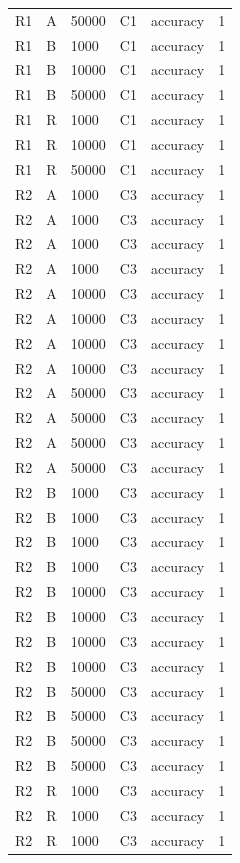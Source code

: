 \begin{longtable}{llllrr}
R1 & A & 50000 & C1 & accuracy & 1 \\
R1 & B & 1000 & C1 & accuracy & 1 \\
R1 & B & 10000 & C1 & accuracy & 1 \\
R1 & B & 50000 & C1 & accuracy & 1 \\
R1 & R & 1000 & C1 & accuracy & 1 \\
R1 & R & 10000 & C1 & accuracy & 1 \\
R1 & R & 50000 & C1 & accuracy & 1 \\
R2 & A & 1000 & C3 & accuracy & 1 \\
R2 & A & 1000 & C3 & accuracy & 1 \\
R2 & A & 1000 & C3 & accuracy & 1 \\
R2 & A & 1000 & C3 & accuracy & 1 \\
R2 & A & 10000 & C3 & accuracy & 1 \\
R2 & A & 10000 & C3 & accuracy & 1 \\
R2 & A & 10000 & C3 & accuracy & 1 \\
R2 & A & 10000 & C3 & accuracy & 1 \\
R2 & A & 50000 & C3 & accuracy & 1 \\
R2 & A & 50000 & C3 & accuracy & 1 \\
R2 & A & 50000 & C3 & accuracy & 1 \\
R2 & A & 50000 & C3 & accuracy & 1 \\
R2 & B & 1000 & C3 & accuracy & 1 \\
R2 & B & 1000 & C3 & accuracy & 1 \\
R2 & B & 1000 & C3 & accuracy & 1 \\
R2 & B & 1000 & C3 & accuracy & 1 \\
R2 & B & 10000 & C3 & accuracy & 1 \\
R2 & B & 10000 & C3 & accuracy & 1 \\
R2 & B & 10000 & C3 & accuracy & 1 \\
R2 & B & 10000 & C3 & accuracy & 1 \\
R2 & B & 50000 & C3 & accuracy & 1 \\
R2 & B & 50000 & C3 & accuracy & 1 \\
R2 & B & 50000 & C3 & accuracy & 1 \\
R2 & B & 50000 & C3 & accuracy & 1 \\
R2 & R & 1000 & C3 & accuracy & 1 \\
R2 & R & 1000 & C3 & accuracy & 1 \\
R2 & R & 1000 & C3 & accuracy & 1 \\

\end{longtable}
